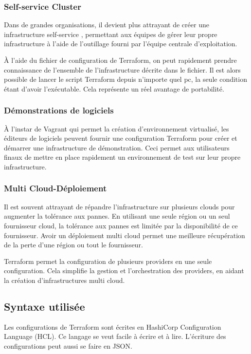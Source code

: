 \documentclass[]{article}
\begin{document}
\subsubsection{Self-service Cluster}\label{self-service-cluster}
Dans de grandes organisations, il devient plus attrayant de créer une
infrastructure \og self-service \fg,
permettant aux équipes de gérer leur propre infrastructure à l'aide de
l'outillage fourni par l'équipe centrale d'exploitation.

À l'aide du fichier de configuration de Terraform, on peut rapidement prendre connaissance de l'ensemble de l'infrastructure décrite dans le fichier. Il est alors possible de lancer le script Terraform depuis n'importe quel pc, la seule condition étant d'avoir l'exécutable. Cela représente un réel avantage de portabilité.

\subsubsection{Démonstrations de logiciels}\label{duxe9mos-de-logiciels}
À l'instar de Vagrant qui permet la création d'environnement virtualisé,
les éditeurs de logiciels peuvent fournir une configuration Terraform
pour créer et démarrer une infrastructure de démonstration. Ceci permet
aux utilisateurs finaux de mettre en place rapidement un environnement
de test sur leur propre infrastructure.

\subsubsection{Multi
Cloud-Déploiement}\label{multi-cloud-duxe9ploiement}
Il est souvent attrayant de répandre l'infrastructure sur plusieurs
clouds pour augmenter la tolérance aux pannes. En utilisant une seule
région ou un seul fournisseur cloud, la tolérance aux pannes est
limitée par la disponibilité de ce fournisseur. Avoir un déploiement
multi cloud permet une meilleure récupération de la perte d'une région
ou tout le fournisseur.

Terraform permet la configuration de plusieurs providers en une seule
configuration. Cela simplifie la gestion et l'orchestration des
providers, en aidant la création d'infrastructures multi cloud.

\subsection{Syntaxe utilisée}\label{syntaxe-utilisuxe9}
Les configurations de Terraform sont écrites en HashiCorp Configuration
Language (HCL). Ce langage se veut facile à écrire et à lire. L'écriture
des configurations peut aussi se faire en JSON.
\end{document}
